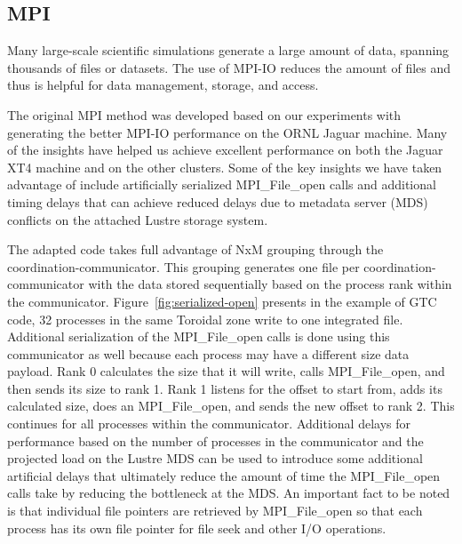 \subsection{MPI}

Many large-scale scientific simulations generate a large amount of data, spanning 
thousands of files or datasets. The use of MPI-IO reduces the amount of files and 
thus is helpful for data management, storage, and access. 

The original MPI method was developed based on our experiments with generating 
the better MPI-IO performance on the ORNL Jaguar machine. Many of the insights 
have helped us achieve excellent performance on both the Jaguar XT4 machine and 
on the other clusters. Some of the key insights we have taken advantage of include 
artificially serialized MPI\_File\_open calls and additional timing delays that 
can achieve reduced delays due to metadata server (MDS) conflicts on the attached 
Lustre storage system.

The adapted code takes full advantage of NxM grouping through the coordination-communicator. 
This grouping generates one file per coordination-communicator with the data stored 
sequentially based on the process rank within the communicator.  Figure~\ref{fig:serialized-open} presents 
in the example of GTC code, 32 processes in the same Toroidal zone write to one 
integrated file. Additional serialization of the MPI\_File\_open calls is done 
using this communicator as well because each process may have a different size 
data payload. Rank 0 calculates the size that it will write, calls MPI\_File\_open, 
and then sends its size to rank 1. Rank 1 listens for the offset to start from, 
adds its calculated size, does an MPI\_File\_open, and sends the new offset to 
rank 2. This continues for all processes within the communicator. Additional delays 
for performance based on the number of processes in the communicator and the projected 
load on the Lustre MDS can be used to introduce some additional artificial delays 
that ultimately reduce the amount of time the MPI\_File\_open calls take by reducing 
the bottleneck at the MDS. An important fact to be noted is that individual file 
pointers are retrieved by MPI\_File\_open so that each process has its own file 
pointer for file seek and other I/O operations.

